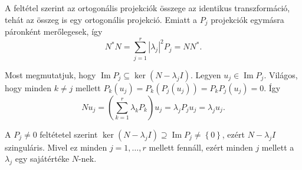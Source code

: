 \documentclass[a4paper, showtrims]{memoir}
\makeatletter
\renewenvironment{proof}[1][\proofname]
    {\par\pushQED{\qed}%
    \normalfont \topsep6\p@\@plus6\p@\relax
    \trivlist
    \item[\hskip\labelsep
        \itshape
    #1\@addpunct{:}]\ignorespaces}
    {\popQED\endtrivlist\@endpefalse}
\theoremstyle{plain}
\theoremstyle{remark}
\theoremstyle{definition}
\DeclareMathOperator{\im}{Im}
\makeatother
\begin{document}
\begin{proof}
	A feltétel szerint az ortogonális projekciók összege az identikus transzformáció, tehát
	az összeg is egy ortogonális projekció.
	Emiatt a $P_j$ projekciók egymásra páronként merőlegesek,
	így
	\[
		N^\ast N
		=
		\sum_{j=1}^r|\lambda_j|^2P_j
		=
		NN^\ast.
	\]

	Most megmutatjuk, hogy 
    $\im P_j\subseteq\ker\left( N-\lambda_jI \right)$.
	Legyen $u_j\in\im P_j$.
	Világos, hogy minden $k\neq j$ mellett
	\begin{math}
		P_k\left( u_j \right)
		=
		P_k\left( P_j\left( u_j \right) \right)
		=
		P_kP_j\left( u_j \right)
        =
        0.
	\end{math}
	Így
	\[
		Nu_j
		=
		\left( \sum_{k=1}^r\lambda_kP_k \right)u_j
		=
        \lambda_{j}P_ju_j
		=
		\lambda_ju_j.
	\]

    A $P_j\neq 0$ feltétetel szerint $\ker\left( N-\lambda_jI \right)\supseteq\im P_j\neq\left\{ 0 \right\}$,
    ezért $N-\lambda_jI$ szinguláris.
    Mivel ez minden $j=1,\ldots,r$ mellett fennáll, ezért minden $j$ mellett a $\lambda_j$ egy sajátértéke $N$-nek. 


\end{proof}
\end{document}
